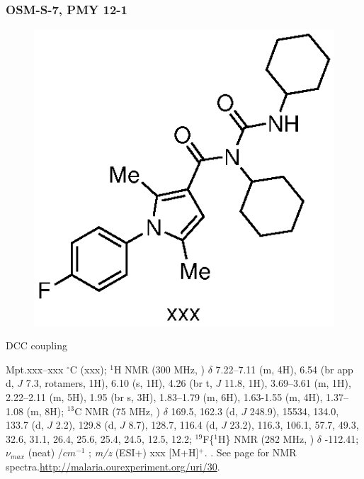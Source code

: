 \documentclass[12pt, a4paper,titlepage]{article}
\begin{document}
\subsubsection*{OSM-S-7, PMY 12-1}
\label{exp:PMY12-1}
	\begin{figure}[H]
	\begin{center}
	\includegraphics{exp/PMY12-1.eps}
	\end{center}
	\vspace{-25pt}	
	\end{figure}	

DCC coupling

Mpt.xxx--xxx $^\circ$C (xxx); 
$^1$H NMR (300 MHz, ) $\delta$ 7.22--7.11 (m, 4H), 6.54 (br app d, $J$ 7.3, rotamers, 1H), 6.10 (s, 1H), 4.26 (br t, $J$ 11.8, 1H), 3.69--3.61 (m, 1H), 2.22--2.11 (m, 5H), 1.95 (br s, 3H), 1.83--1.79 (m, 6H), 1.63-1.55 (m, 4H), 1.37--1.08 (m, 8H); 
  $^{13}$C NMR (75 MHz, ) $\delta$ 169.5, 162.3 (d, $J$ 248.9), 15534, 134.0, 133.7 (d, $J$ 2.2), 129.8 (d, $J$ 8.7), 128.7, 116.4 (d, $J$ 23.2), 116.3, 106.1, 57.7, 49.3, 32.6, 31.1, 26.4, 25.6, 25.4, 24.5, 12.5, 12.2; 
$^{19}$F\{$^1$H\} NMR (282 MHz, ) $\delta$ -112.41; 
 $\nu_{max}$ (neat) /$cm^{-1}$ ; 
\emph{m/z} (ESI+) xxx [M+H]$^+$.
. 
See page \pageref{spec:PMY12-1} for NMR spectra.\url{http://malaria.ourexperiment.org/uri/30}. 
\end{document}

